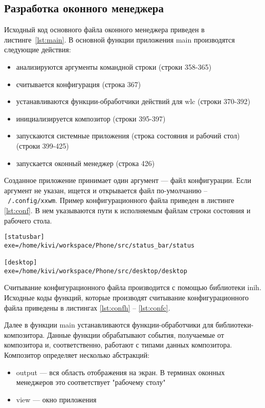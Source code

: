 \subsection{Разработка оконного менеджера}
Исходный код основного файла оконного менеджера приведен в листинге~\ref{lst:main}. В основной функции приложения main производятся следующие действия:
\begin{itemize}
\item анализируются аргументы командной строки (строки 358-365)
\item считывается конфигурация (строка 367)
\item устанавливаются функции-обработчики действий для wlc (строки 370-392)
\item инициализируется композитор (строки 395-397)
\item запускаются системные приложения (строка состояния и рабочий стол) (строки 399-425)
\item запускается оконный менеджер (строка 426)
\end{itemize}

Созданное приложение принимает один аргумент --- файл конфигурации. Если аргумент не указан, ищется и открывается файл по-умолчанию -- \texttt{~/.config/xxwm}. Пример конфигурационного файла приведен в листинге \ref{lst:conf}. В нем указываются пути к исполняемым файлам строки состояния и рабочего стола.

\begin{lstlisting}[label=lst:conf, caption={Формат конфигурационного файла ОМ}]
[statusbar]
exe=/home/kivi/workspace/Phone/src/status_bar/status

[desktop]
exe=/home/kivi/workspace/Phone/src/desktop/desktop
\end{lstlisting}

Считывание конфигурационного файла производится с помощью библиотеки inih. Исходные коды функций, которые производят считывание конфигурационного файла приведены в листингах \ref{lst:confh} -- \ref{lst:confc}.

Далее в функции main устанавливаются функции-обработчики для библиотеки-композитора. Данные функции обрабатывают события, получаемые от композитора и, соответственно, работают с типами данных композитора.  Композитор определяет несколько абстракций:
\begin{itemize}
\item output --- вся область отображения на экран. В терминах оконных менеджеров это соответствует "рабочему столу"
\item view --- окно приложения
\end{itemize}

